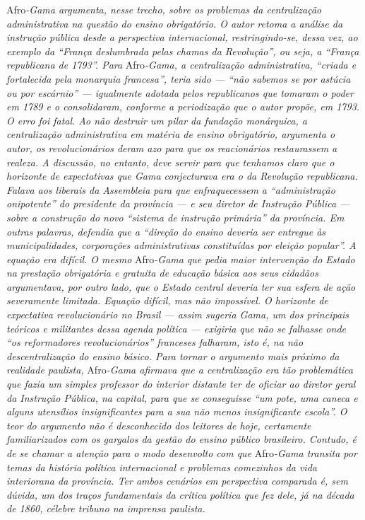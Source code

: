 \begin{didascalia}
Afro\emph{-Gama argumenta, nesse trecho, sobre os problemas da
centralização administrativa na questão do ensino obrigatório. O autor
retoma a análise da instrução pública desde a perspectiva internacional,
restringindo-se, dessa vez, ao exemplo da ``França deslumbrada pelas
chamas da Revolução'', ou seja, a ``França republicana de 1793''. Para}
Afro\emph{-Gama, a centralização administrativa, ``criada e fortalecida
pela monarquia francesa'', teria sido --- ``não sabemos se por astúcia ou
por escárnio'' --- igualmente adotada pelos republicanos que tomaram o
poder em 1789 e o consolidaram, conforme a periodização que o autor
propõe, em 1793. O erro foi fatal. Ao não destruir um pilar da fundação
monárquica, a centralização administrativa em matéria de ensino
obrigatório, argumenta o autor, os revolucionários deram azo para que os
reacionários restaurassem a realeza. A discussão, no entanto, deve
servir para que tenhamos claro que o horizonte de expectativas que Gama
conjecturava era o da Revolução republicana. Falava aos liberais da
Assembleia para que enfraquecessem a ``administração onipotente'' do
presidente da província --- e seu diretor de Instrução Pública --- sobre a
construção do novo ``sistema de instrução primária'' da província. Em
outras palavras, defendia que a ``direção do ensino deveria ser
entregue às municipalidades, corporações administrativas constituídas
por eleição popular''. A equação era difícil. O mesmo} Afro\emph{-Gama
que pedia maior intervenção do Estado na prestação obrigatória e
gratuita de educação básica aos seus cidadãos argumentava, por outro
lado, que o Estado central deveria ter sua esfera de ação severamente
limitada. Equação difícil, mas não impossível. O horizonte de
expectativa revolucionário no Brasil --- assim sugeria Gama, um dos
principais teóricos e militantes dessa agenda política --- exigiria que
não se falhasse onde ``os reformadores revolucionários'' franceses
falharam, isto é, na não descentralização do ensino básico. Para tornar
o argumento mais próximo da realidade paulista,} Afro\emph{-Gama
afirmava que a centralização era tão problemática que fazia um simples
professor do interior distante ter de oficiar ao diretor geral da
Instrução Pública, na capital, para que se conseguisse ``um pote, uma
caneca e alguns utensílios insignificantes para a sua não menos
insignificante escola''. O teor do argumento não é desconhecido dos
leitores de hoje, certamente familiarizados com os gargalos da gestão do
ensino público brasileiro. Contudo, é de se chamar a atenção para o modo
desenvolto com que} Afro\emph{-Gama transita por temas da história
política internacional e problemas comezinhos da vida interiorana da
província. Ter ambos cenários em perspectiva comparada é, sem dúvida, um
dos traços fundamentais da crítica política que fez dele, já na década
de 1860, célebre tribuno na imprensa paulista.}
\end{didascalia}



